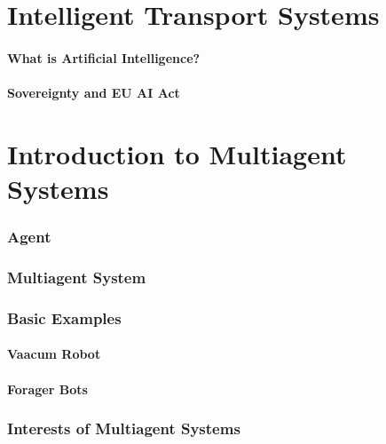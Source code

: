 


\part{Intelligent Transport Systems}
\begin{bibliographysection}

	
	
	
	\subsection{What is Artificial Intelligence?}
	
	
	
	
	

	\subsection{Sovereignty and EU AI Act}
	

	
	
	\thanksslide
\end{bibliographysection}

\part{Introduction to Multiagent Systems}
\begin{bibliographysection}

	\section{Agent}
	

	\section{Multiagent System}
	

	\section{Basic Examples}
	\subsection{Vaacum Robot}
	
	\subsection{Forager Bots}
	

	\section{Interests of Multiagent Systems}
	

	\thanksslide
\end{bibliographysection}

